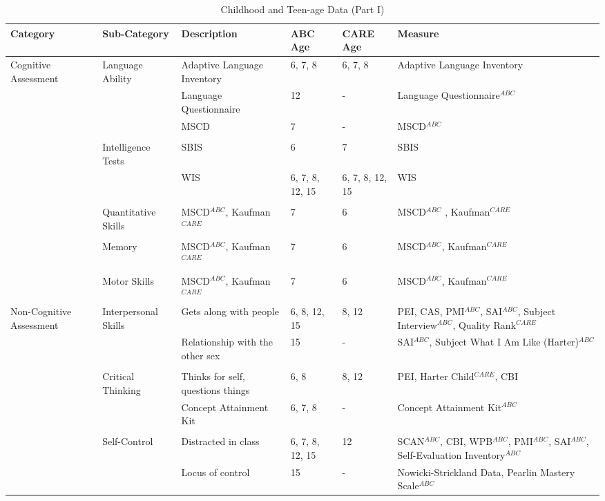 \begin{sidewaystable}[H]
\begin{threeparttable}
\small
\caption{Childhood and Teen-age Data (Part I)} \label{tab:youthvars_1}
\centering
\tiny
\begin{tabular}{L{3.5cm} C{3.5cm} C{5cm} C{1.5cm} C{1.5cm} C{6cm}}
\hline \hline
Category	&	Sub-Category	&	Description	&	ABC Age &	CARE Age 	&	Measure	\\ \midrule
Cognitive Assessment	&	Language Ability	&	Adaptive Language Inventory	&	6, 7, 8	&	6, 7, 8	&	Adaptive Language Inventory	\\
	&		&	Language Questionnaire	&	12	&	- 	&	Language Questionnaire$^{ABC}$	\\
	&		&	MSCD 	&	7	&	- 	&	MSCD$^{ABC}$	\\
	&	\\
	&	Intelligence Tests	&	SBIS	 &	6	&	7	&	SBIS	\\
	&		&	 WIS	&	6, 7, 8, 12, 15	&	6, 7, 8, 12, 15	&	WIS	\\
	&	\\
	&	Quantitative Skills	&	MSCD$^{ABC}$, Kaufman$^{CARE}$ 	&	7	&	6	&	MSCD$^{ABC}$ , Kaufman$^{CARE}$	\\
	&	\\
	&	Memory	&	MSCD$^{ABC}$, Kaufman$^{CARE}$ 	&	7	&	6	&	MSCD$^{ABC}$, Kaufman$^{CARE}$	\\
	&	\\
	&	Motor Skills	&	MSCD$^{ABC}$, Kaufman$^{CARE}$ 	&	7	&	6	&	MSCD$^{ABC}$, Kaufman$^{CARE}$	\\ \midrule
Non-Cognitive Assessment	&	Interpersonal Skills	&	Gets along with people	&	6, 8, 12, 15	& 	8, 12	&	PEI, CAS, PMI$^{ABC}$, SAI$^{ABC}$, Subject Interview$^{ABC}$, Quality Rank$^{CARE}$	\\
	&		&	Relationship with the other sex	&	15	&	- 	&	 SAI$^{ABC}$, Subject What I Am Like (Harter)$^{ABC}$	\\
	&	\\
	&	Critical Thinking	&	Thinks for self, questions things	&	6, 8	 &	8, 12	&	PEI, Harter Child$^{CARE}$, CBI	\\
	&		&	Concept Attainment Kit	&	6, 7, 8	&	- 	&	Concept Attainment Kit$^{ABC}$	\\
	&	\\
	&	Self-Control	&	Distracted in class	&	6, 7, 8, 12, 15	&	12	&	SCAN$^{ABC}$, CBI, WPB$^{ABC}$, PMI$^{ABC}$, SAI$^{ABC}$, Self-Evaluation Inventory$^{ABC}$	\\
	&		&	Locus of control	&	15	&	- 	&	Nowicki-Strickland Data, Pearlin Mastery Scale$^{ABC}$	\\

\end{tabular}
\end{threeparttable}
\end{sidewaystable}
